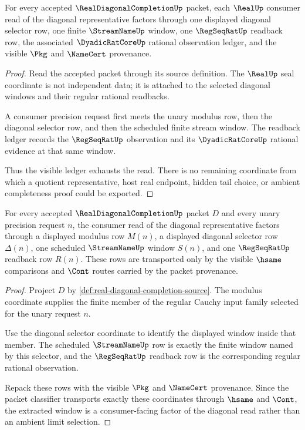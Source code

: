 \begin{theorem}
\label{thm:real-diagonal-completion-ledger-exactness}
For every accepted $\RealDiagonalCompletionUp$ packet, each $\RealUp$ consumer read of the diagonal representative factors through one displayed diagonal selector row, one finite $\StreamNameUp$ window, one $\RegSeqRatUp$ readback row, the associated $\DyadicRatCoreUp$ rational observation ledger, and the visible $\Pkg$ and $\NameCert$ provenance.
\end{theorem}
\begin{proof}
Read the accepted packet through its source definition. The $\RealUp$ seal coordinate is not independent data; it is attached to the selected diagonal windows and their regular rational readbacks.

A consumer precision request first meets the unary modulus row, then the diagonal selector row, and then the scheduled finite stream window. The readback ledger records the $\RegSeqRatUp$ observation and its $\DyadicRatCoreUp$ rational evidence at that same window.

Thus the visible ledger exhausts the read. There is no remaining coordinate from which a quotient representative, host real endpoint, hidden tail choice, or ambient completeness proof could be exported.
\end{proof}

\begin{theorem}
\label{thm:real-diagonal-completion-window-extraction}
For every accepted $\RealDiagonalCompletionUp$ packet $D$ and every unary precision request $n$, the consumer read of the diagonal representative factors through a displayed modulus row $M(n)$, a displayed diagonal selector row $\Delta(n)$, one scheduled $\StreamNameUp$ window $S(n)$, and one $\RegSeqRatUp$ readback row $R(n)$. These rows are transported only by the visible $\hsame$ comparisons and $\Cont$ routes carried by the packet provenance.
\end{theorem}
\begin{proof}
Project $D$ by \autoref{def:real-diagonal-completion-source}. The modulus coordinate supplies the finite member of the regular Cauchy input family selected for the unary request $n$.

Use the diagonal selector coordinate to identify the displayed window inside that member. The scheduled $\StreamNameUp$ row is exactly the finite window named by this selector, and the $\RegSeqRatUp$ readback row is the corresponding regular rational observation.

Repack these rows with the visible $\Pkg$ and $\NameCert$ provenance. Since the packet classifier transports exactly these coordinates through $\hsame$ and $\Cont$, the extracted window is a consumer-facing factor of the diagonal read rather than an ambient limit selection.
\end{proof}

